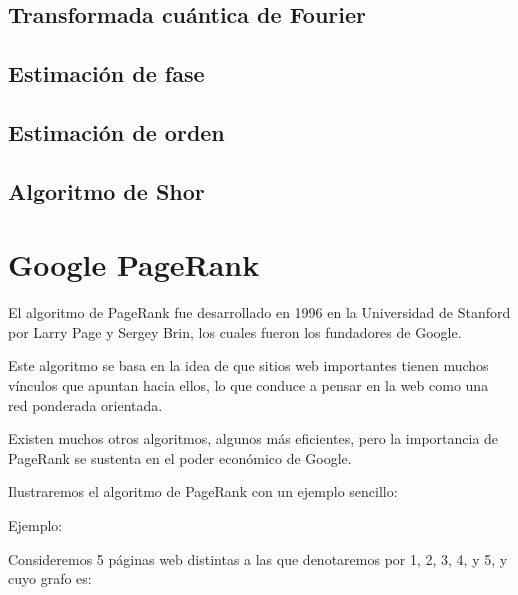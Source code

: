 \documentclass[11pt, spanish]{report}
\begin{document}
\section{Transformada cuántica de Fourier}

\section{Estimación de fase}

\section{Estimación de orden}

\section{Algoritmo de Shor}

\chapter{Google PageRank}

El algoritmo de PageRank fue desarrollado en 1996 en la Universidad de Stanford por Larry Page y Sergey Brin, los cuales fueron los fundadores de Google.

Este algoritmo se basa en la idea de que sitios web importantes tienen muchos vínculos que apuntan hacia ellos, lo que conduce a pensar en la web como una red ponderada orientada.

Existen muchos otros algoritmos, algunos más eficientes, pero la importancia de PageRank se sustenta en el poder económico de Google.

Ilustraremos el algoritmo de PageRank con un ejemplo sencillo:

Ejemplo:

Consideremos 5 páginas web distintas a las que denotaremos por 1, 2, 3, 4, y 5, y cuyo grafo es:
\vspace{3cm}
\end{document}
